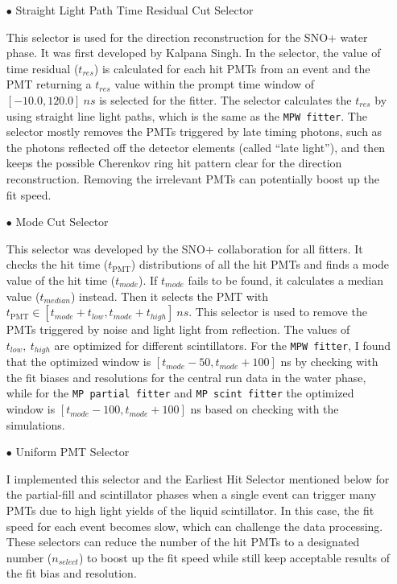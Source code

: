 \begin{itemize}
	\item[$\bullet$] Straight Light Path Time Residual Cut Selector
	
	This selector is used for the direction reconstruction for the SNO+ water phase. It was first developed by Kalpana Singh\cite{kalpanaMPFitter}. In the selector, the value of time residual ($t_{res}$) is calculated for each hit PMTs from an event and the PMT returning a $t_{res}$ value within the prompt time window of $[-10.0, 120.0]~ns$ is selected for the fitter. The selector calculates the $t_{res}$ by using straight line light paths, which is the same as the \texttt{MPW fitter}. The selector mostly removes the PMTs triggered by late timing photons, such as the photons reflected off the detector elements (called ``late light''), and then keeps the possible Cherenkov ring hit pattern clear for the direction reconstruction. Removing the irrelevant PMTs can potentially boost up the fit speed.
	
	\item[$\bullet$] Mode Cut Selector
	
	This selector was developed by the SNO+ collaboration for all fitters. It checks the hit time ($t_\mathrm{PMT}$) distributions of all the hit PMTs and finds a mode value of the hit time ($t_{mode}$). If $t_{mode}$ fails to be found, it calculates a median value ($t_{median}$) instead\cite{modeCut}. Then it selects the PMT with $t_\mathrm{PMT} \in [t_{mode}+t_{low}, t_{mode}+t_{high}]~ns$. This selector is used to remove the　PMTs triggered by noise and light light from reflection. The values of $t_{low},~t_{high}$ are optimized for different scintillators. For the \texttt{MPW fitter}, I found that the optimized window is $[t_{mode}-50, t_{mode}+100]$ ns by checking with the fit biases and resolutions for the  central run data in the water phase, while for the \texttt{MP partial fitter} and \texttt{MP scint fitter} the optimized window is $[t_{mode}-100, t_{mode}+100]$ ns based on checking with the simulations.
	
	\item[$\bullet$] Uniform PMT Selector
	
	I implemented this selector and the Earliest Hit Selector mentioned below for the partial-fill and scintillator phases when a single event can trigger many PMTs due to high light yields of the liquid scintillator. In this case, the fit speed for each event becomes slow, which can challenge the data processing. These selectors can reduce the number of the hit PMTs to a designated number ($n_{select}$) to boost up the fit speed while still keep acceptable results of the fit bias and resolution. 
	

\end{itemize}
